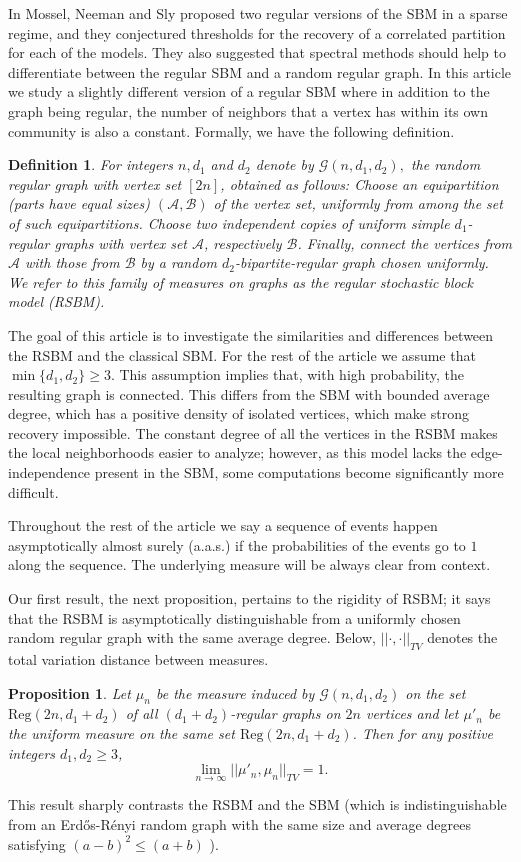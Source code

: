 \documentclass[11pt,reqno]{amsart}
\newtheorem{proposition}{Proposition}
\newtheorem{definition}{Definition}
\newcommand{\er}{{Erd\H{o}s-R\'enyi }}
\begin{document}
In \cite{MNS12} Mossel, Neeman and Sly proposed two regular versions
of the SBM in a sparse regime, and they conjectured thresholds for the
recovery of a correlated partition for each of the models. They also suggested that spectral methods should help to differentiate between the regular SBM and a random regular graph. 
In this article we study a slightly different version of a regular SBM where in addition to the graph being regular,  the number of neighbors that a vertex has within its own community is also a constant. Formally, we have the following definition.
\begin{definition}\label{model}
For integers $n,d_1$ and $d_2$ denote  by $\mathcal{G}(n,d_1,d_2),$
the random regular graph with vertex set $[2n]$, obtained as follows:
Choose an equipartition (parts have equal sizes) $(\mathcal{A}, \mathcal{B})$ of the vertex set, uniformly from
among the set of such equipartitions. Choose two independent copies of uniform simple $d_1$-regular graphs  with vertex set $\mathcal{A}$, respectively $\mathcal{B}$. Finally, connect the vertices from $\mathcal{A}$ with those from $\mathcal{B}$ by a random $d_2$-bipartite-regular graph chosen uniformly. We refer to this family of measures on graphs as the regular stochastic block model (RSBM).
\end{definition}

The goal of this article is to investigate the similarities and
differences between the RSBM and the classical SBM. For the rest of
the article we assume that  $\min\{d_1,d_2\}\geq 3$.  This assumption
implies that, with high probability, the resulting graph is
connected. This differs from the SBM with bounded average degree,
which has a positive density of isolated vertices, which make strong recovery impossible. 
The  constant degree of all the vertices in the RSBM makes the local
neighborhoods easier to analyze; however, as this model lacks the edge-independence present in the SBM,  some computations become significantly more difficult. 

Throughout the rest of the article we say a sequence of events happen asymptotically almost surely (a.a.s.) if the probabilities of the events go to $1$ along the sequence. The underlying measure will be always clear from context.

Our first result, the next proposition, pertains to the rigidity of
RSBM; it says that the RSBM is asymptotically distinguishable from a uniformly chosen random regular
graph with the same average degree. Below, $||\cdot,\cdot||_{TV}$ denotes the total variation distance between measures.
\begin{proposition}\label{orthogonal}
Let $\mu_n$ be the measure induced by $\mathcal{G}(n,d_1,d_2)$ on the
set $\text{Reg}(2n,d_1+d_2)$ of all $(d_1+d_2)$-regular graphs on $2n$
vertices and let $\mu'_n$ be the uniform measure on the same set
$\text{Reg}(2n,d_1+d_2)$. Then for any positive integers $d_1, d_2
\geq 3$,
$$\lim_{n\to \infty} ||\mu'_{n},\mu_n||_{TV} = 1.$$ 
\end{proposition}
This result sharply contrasts the RSBM and the SBM (which is
indistinguishable from an \er random graph with the same size and
average degrees satisfying $(a-b)^2\leq (a+b)$ \cite{MNS12}).
\end{document}

